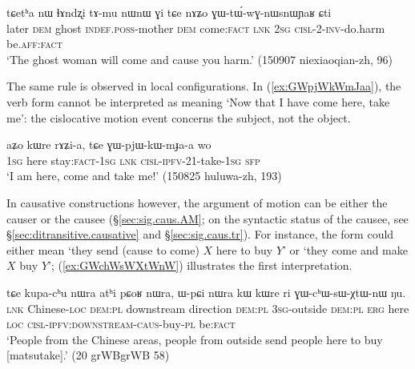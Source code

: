 \begin{exe}
\ex  \label{ex:GWtWwnWGnWsnWYaR}
 \gll  tɕetʰa nɯ ɬɤndʐi tɤ-mu nɯnɯ ɣi tɕe nɤʑo ɣɯ-tɯ́-wɣ-nɯsnɯɲaʁ ɕti \\
 later \textsc{dem} ghost \textsc{indef}.\textsc{poss}-mother \textsc{dem} come:\textsc{fact} \textsc{lnk} \textsc{2sg} \textsc{cisl}-2-\textsc{inv}-do.harm be.\textsc{aff}:\textsc{fact} \\
\glt `The ghost woman will come and cause you harm.' (150907 niexiaoqian-zh, 96)
\end{exe}

The same rule is observed in local configurations. In (\ref{ex:GWpjWkWmJaa}), the verb form  cannot be interpreted as meaning `Now that I have come here, take me': the cislocative motion event concerns the subject, not the object.

\begin{exe}
\ex  \label{ex:GWpjWkWmJaa}
 \gll aʑo kɯre rɤʑi-a, tɕe ɣɯ-pjɯ-kɯ-mɟa-a wo \\
 \textsc{1sg} here stay:\textsc{fact}-\textsc{1sg} \textsc{lnk} \textsc{cisl}-\textsc{ipfv}-2\fl{}1-take-\textsc{1sg} \textsc{sfp} \\
 \glt `I am here, come and take me!' (150825 huluwa-zh, 193)
\end{exe}

In causative constructions however, the argument of motion can be either the causer  or the causee (§\ref{sec:sig.caus.AM}; on the syntactic status of the causee, see §\ref{sec:ditransitive.causative} and §\ref{sec:sig.caus.tr}). For instance, the form  could either mean `they send (cause to come) $X$ here to buy $Y$' or `they come and make $X$ buy $Y$'; (\ref{ex:GWchWsWXtWnW}) illustrates the first interpretation.

\begin{exe}
\ex \label{ex:GWchWsWXtWnW}
\gll tɕe kupa-cʰu nɯra atʰi pɕoʁ nɯra, ɯ-pɕi nɯra kɯ kɯre ri ɣɯ-cʰɯ-sɯ-χtɯ-nɯ ŋu.  \\
\textsc{lnk} Chinese-\textsc{loc} \textsc{dem}:\textsc{pl} downstream direction \textsc{dem}:\textsc{pl} \textsc{3sg}-outside  \textsc{dem}:\textsc{pl}  \textsc{erg} here \textsc{loc} \textsc{cisl}-\textsc{ipfv}:\textsc{downstream}-\textsc{caus}-buy-\textsc{pl} be:\textsc{fact} \\ 
\glt `People from the Chinese areas, people from outside send people here to buy [matsutake].' (20 grWBgrWB 58)  
\end{exe} 

